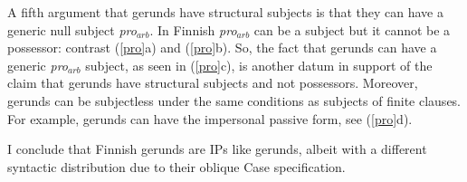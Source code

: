\documentclass[output=paper,
modfonts
]{LSP/langsci}
\newcommand{\rfa}[2]{(\ref{#1}{#2})}
\begin{document}
A fifth argument that gerunds have structural subjects is that they can have a
generic null subject \textit{pro$_{arb}$}. In Finnish \textit{pro$_{arb}$} can be a subject \citep{hakulinen1973} but it cannot be
a possessor: contrast \rfa{pro}{a} and \rfa{pro}{b}.  So, the fact that gerunds can have a generic
\textit{pro$_{arb}$} subject, as seen in \rfa{pro}{c}, is another datum in support of the claim
that gerunds have structural subjects and not possessors.  Moreover, gerunds can be subjectless
under the same conditions as subjects of finite clauses.  For example, gerunds can have the
impersonal passive form, see \rfa{pro}{d}.
\begin{exe}
\ex\label{pro}
	\begin{xlist}



	\end{xlist}
\end{exe}

I conclude that Finnish gerunds are IPs like  gerunds, albeit with a different syntactic
distribution due to their oblique Case specification.
\end{document}
